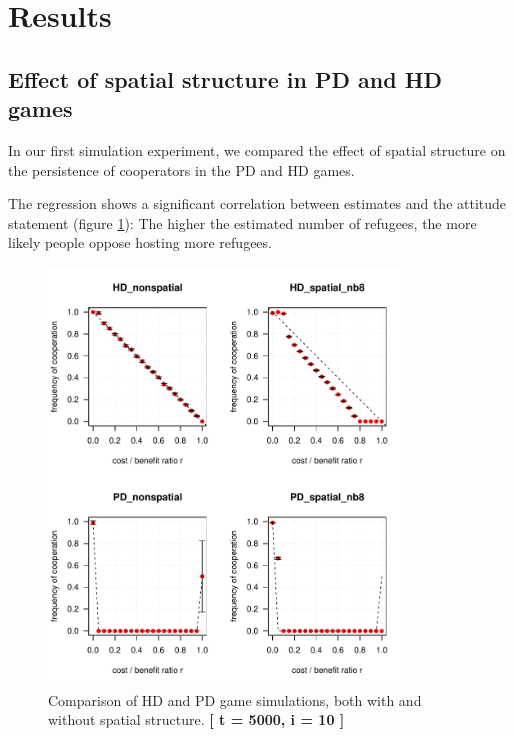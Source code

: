 \section{Results}


\subsection{Effect of spatial structure in PD and HD games}
In our first simulation experiment, we compared the effect of spatial structure on the persistence of cooperators in the PD and HD games.





The regression shows a significant correlation between estimates and the attitude statement (figure \ref{fig: task1_4plot}): The higher the estimated number of refugees, the more likely people oppose hosting more refugees.



\begin{figure}
	\centering 
	\includegraphics[width=9.5cm]{task1_4plot}
	\caption{Comparison of HD and PD game simulations, both with and without spatial structure.  \textbf{[ t = 5000, i = 10 ]} }\label{fig: task1_4plot}
\end{figure}


